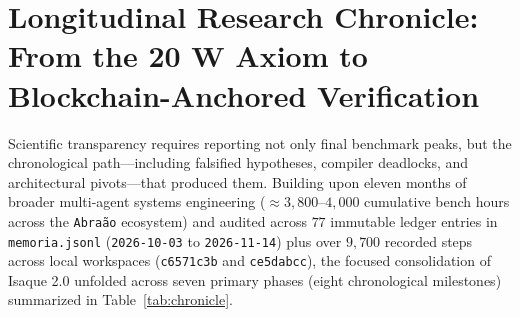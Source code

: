 \documentclass[10pt,a4paper]{article}
\begin{document}
\section{Longitudinal Research Chronicle: From the 20 W Axiom to Blockchain-Anchored Verification}

Scientific transparency requires reporting not only final benchmark peaks, but the chronological path---including falsified hypotheses, compiler deadlocks, and architectural pivots---that produced them. Building upon eleven months of broader multi-agent systems engineering ($\approx 3,800\text{--}4,000$ cumulative bench hours across the \texttt{Abra\~ao} ecosystem) and audited across $77$ immutable ledger entries in \texttt{memoria.jsonl} (\texttt{2026-10-03} to \texttt{2026-11-14}) plus over $9,700$ recorded steps across local workspaces (\texttt{c6571c3b} and \texttt{ce5dabcc}), the focused consolidation of Isaque 2.0 unfolded across seven primary phases (eight chronological milestones) summarized in Table~\ref{tab:chronicle}.
\end{document}
